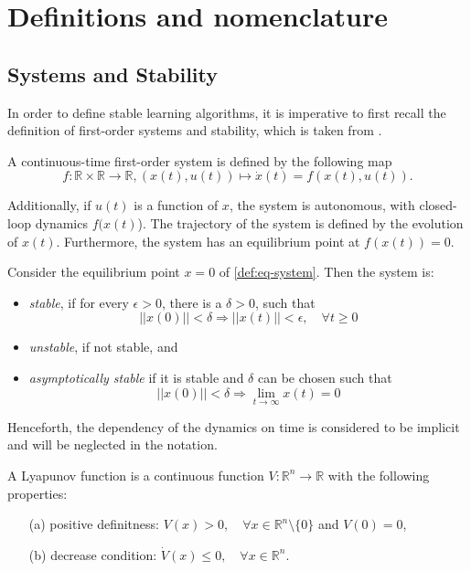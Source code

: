 \section{Definitions and nomenclature}
\label{sec:definitions}
\subsection{Systems and Stability}
In order to define stable learning algorithms, it is imperative to first recall the definition of first-order systems and stability, which is taken from \cite{khalil_nonlinear_2002}.

\begin{definition}
 A continuous-time first-order system is defined by the following map
    \begin{equation}
    f:\mathbb{R}\times\mathbb{R}\rightarrow \mathbb{R}, (x(t),u(t)) \mapsto \dot x(t) = f(x(t),u(t)).
    \label{def:eq-system}
    \end{equation}

 Additionally, if $u(t)$ is a function of $x$, the system is autonomous, with closed-loop dynamics $f(x(t)$). The trajectory of the system is defined by the evolution of $x(t)$. Furthermore, the system has an equilibrium point at $f(x(t))=0$.
    \label{def:system}
\end{definition}

\begin{definition}[Stability]
 Consider the equilibrium point $x=0$ of \eqref{def:eq-system}. Then the system is:
 \begin{itemize}
 \item \textit{stable}, if for every $\epsilon>0$, there is a $\delta>0$, such that
     $$||x(0)||<\delta \Rightarrow ||x(t)||<\epsilon, \quad \forall t \geq 0$$ 
 \item \textit{unstable}, if not stable, and
 \item \textit{asymptotically stable} if it is stable and $\delta$ can be chosen such that
     $$||x(0)||<\delta \Rightarrow \lim_{t\rightarrow\infty} x(t)=0 $$
 \end{itemize} 
\end{definition}
Henceforth, the dependency of the dynamics on time is considered to be implicit and will be neglected in the notation.


\begin{definition}
 A Lyapunov function is a continuous function $V: \mathbb{R}^n\rightarrow\mathbb{R}$ with the following properties:
 \begin{enumerate}
  \item[(a)] positive definitness: $V(x)>0, \quad \forall x\in\mathbb{R}^n\setminus\{0\}$ and $V(0)=0$,
  \item[(b)] decrease condition: $\dot V(x)\leq0, \quad \forall x\in\mathbb{R}^n$.
 \end{enumerate}
\end{definition}

